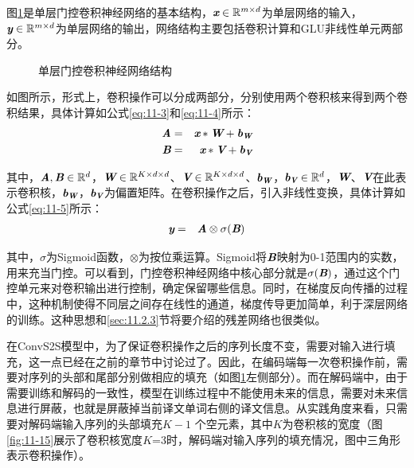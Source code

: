\parinterval 图\ref{fig:11-14}是单层门控卷积神经网络的基本结构，$\textbf{\em x}\in \mathbb{R}^{m\times d}$为单层网络的输入，$\textbf{\em y} \in \mathbb{R}^{m \times d}$为单层网络的输出，网络结构主要包括卷积计算和GLU非线性单元两部分。

\begin{figure}[htp]
\centering

\caption{单层门控卷积神经网络结构}
\label{fig:11-14}
\end{figure}


\parinterval 如图所示，形式上，卷积操作可以分成两部分，分别使用两个卷积核来得到两个卷积结果，具体计算如公式\eqref{eq:11-3}和\eqref{eq:11-4}所示：
\begin{eqnarray}
\textbf{\em A} & = & \textbf{\em x} * \textbf{\em W} + \textbf{\em b}_{\textbf{\em W}} \label{eq:11-3} \\
\textbf{\em B} & = & \textbf{\em x} * \textbf{\em V} + \textbf{\em b}_{\textbf{\em V}} \label{eq:11-4}
\end{eqnarray}

\noindent 其中，$\textbf{\em A},\textbf{\em B}\in \mathbb{R}^d$，$\textbf{\em W}\in \mathbb{R}^{K\times d \times d}$、$\textbf{\em V}\in \mathbb{R}^{K\times d \times d}$、$\textbf{\em b}_{\textbf{\em W}}$，$\textbf{\em b}_{\textbf{\em V}} \in \mathbb{R}^d $，$\textbf{\em W}$、$\textbf{\em V}$在此表示卷积核，$\textbf{\em b}_{\textbf{\em W}}$，$\textbf{\em b}_{\textbf{\em V}}$为偏置矩阵。在卷积操作之后，引入非线性变换，具体计算如公式\eqref{eq:11-5}所示：
\begin{eqnarray}
\textbf{\em y} & = & \textbf{\em A} \otimes \sigma ( \textbf{\em B} )
\label{eq:11-5}
\end{eqnarray}

\noindent 其中，$\sigma$为Sigmoid函数，$\otimes$为按位乘运算。Sigmoid将$\textbf{\em B}$映射为0-1范围内的实数，用来充当门控。可以看到，门控卷积神经网络中核心部分就是$\sigma ( \textbf{\em B} )$，通过这个门控单元来对卷积输出进行控制，确定保留哪些信息。同时，在梯度反向传播的过程中，这种机制使得不同层之间存在线性的通道，梯度传导更加简单，利于深层网络的训练。这种思想和\ref{sec:11.2.3}节将要介绍的残差网络也很类似。

\parinterval 在ConvS2S模型中，为了保证卷积操作之后的序列长度不变，需要对输入进行填充，这一点已经在之前的章节中讨论过了。因此，在编码端每一次卷积操作前，需要对序列的头部和尾部分别做相应的填充（如图\ref{fig:11-14}左侧部分）。而在解码端中，由于需要训练和解码的一致性，模型在训练过程中不能使用未来的信息，需要对未来信息进行屏蔽，也就是屏蔽掉当前译文单词右侧的译文信息。从实践角度来看，只需要对解码端输入序列的头部填充$K-1$ 个空元素，其中$K$为卷积核的宽度（图\ref{fig:11-15}展示了卷积核宽度$K$=3时，解码端对输入序列的填充情况，图中三角形表示卷积操作）。

